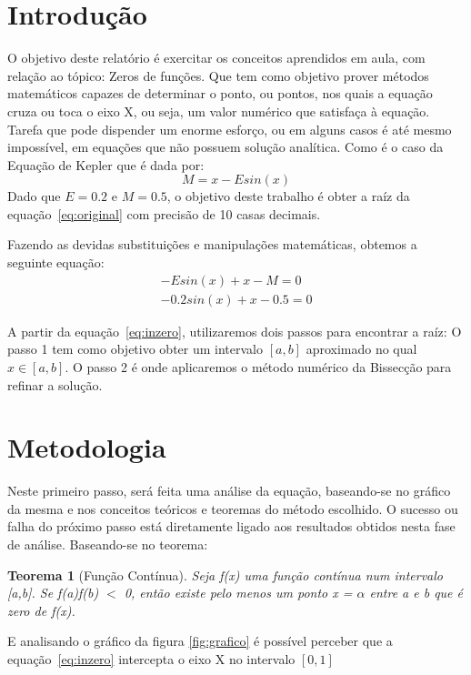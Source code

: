 \documentclass[12pt]{article}
\begin{document}
\section{Introdução}

O objetivo deste relatório é exercitar os conceitos aprendidos em aula, com relação ao tópico: Zeros de funções. Que tem como objetivo prover métodos matemáticos capazes de determinar o ponto, ou pontos, nos quais a equação cruza ou toca o eixo X, ou seja, um valor numérico que satisfaça à equação. Tarefa que pode dispender um enorme esforço, ou em alguns casos é até mesmo impossível, em equações que não possuem solução analítica. Como é o caso da Equação de Kepler que é dada por:
\begin{equation} \label{eq:original}
  M = x - E sin(x)
\end{equation}
Dado que $E = 0.2$ e $M = 0.5$, o objetivo deste trabalho é obter a raíz da equação~\eqref{eq:original} com precisão de 10 casas decimais.

Fazendo as devidas substituições e manipulações matemáticas, obtemos a seguinte equação:
\begin{eqnarray}\label{eq:inzero}
  -E sin(x) + x - M = 0 \nonumber\\
  -0.2sin(x) + x - 0.5 = 0
\end{eqnarray}

A partir da equação~\eqref{eq:inzero}, utilizaremos dois passos para encontrar a raíz: O passo 1 tem como objetivo obter um intervalo $[a,b]$ aproximado no qual $x \in [a,b]$. O passo 2 é onde aplicaremos o método numérico da Bissecção para refinar a solução.

\section{Metodologia}

Neste primeiro passo, será feita uma análise da equação, baseando-se no gráfico da mesma e nos conceitos teóricos e teoremas do método escolhido. O sucesso ou falha do próximo passo está diretamente ligado aos resultados obtidos nesta fase de análise.
Baseando-se no teorema:
\newtheorem{ambiente}{Teorema}
\begin{ambiente}[Função Contínua]\label{teo:teorema}
Seja f(x) uma função contínua num intervalo [a,b]. Se f(a)f(b) $<$ 0, então existe pelo menos um ponto
x = $\alpha$ entre a e b que é zero de f(x).
\end{ambiente}

E analisando o gráfico da figura \ref{fig:grafico} é possível perceber que a equação~\eqref{eq:inzero} intercepta o eixo X no intervalo $[0,1]$
\end{document}
